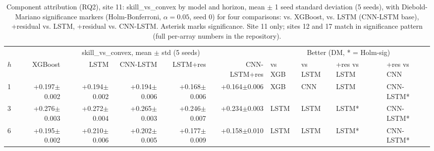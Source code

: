 \begin{table}[t]
  \centering
  \scriptsize
  \caption{Component attribution (RQ2), site 11: skill\_vs\_convex by model and horizon, mean $\pm$ 1 seed standard deviation (5 seeds), with Diebold-Mariano significance markers (Holm-Bonferroni, $\alpha=0.05$, seed 0) for four comparisons: vs. XGBoost, vs. LSTM (CNN-LSTM base), +residual vs. LSTM, +residual vs. CNN-LSTM. Asterisk marks significance. Site 11 only; sites 12 and 17 match in significance pattern (full per-array numbers in the repository).}
  \label{tab:T5}
  \begin{tabular}{l rrrrr llll}
    \toprule
    & \multicolumn{5}{c}{skill\_vs\_convex, mean $\pm$ std (5 seeds)} & \multicolumn{4}{c}{Better (DM, * = Holm-sig)} \\
    \cmidrule(lr){2-6} \cmidrule(lr){7-10}
    $h$ & XGBoost & LSTM & CNN-LSTM & LSTM+res & CNN-LSTM+res & vs XGB & vs LSTM & +res vs LSTM & +res vs CNN \\
    \midrule
    1 & +0.197$\pm$0.002 & +0.194$\pm$0.002 & +0.194$\pm$0.006 & +0.168$\pm$0.006 & +0.164$\pm$0.006 & XGB & CNN & LSTM & CNN-LSTM* \\
    3 & +0.276$\pm$0.003 & +0.272$\pm$0.004 & +0.265$\pm$0.003 & +0.246$\pm$0.007 & +0.234$\pm$0.003 & LSTM & LSTM & LSTM* & CNN-LSTM* \\
    6 & +0.195$\pm$0.002 & +0.210$\pm$0.006 & +0.202$\pm$0.005 & +0.177$\pm$0.009 & +0.158$\pm$0.010 & LSTM & LSTM & LSTM* & CNN-LSTM* \\
    \bottomrule
  \end{tabular}
\end{table}
